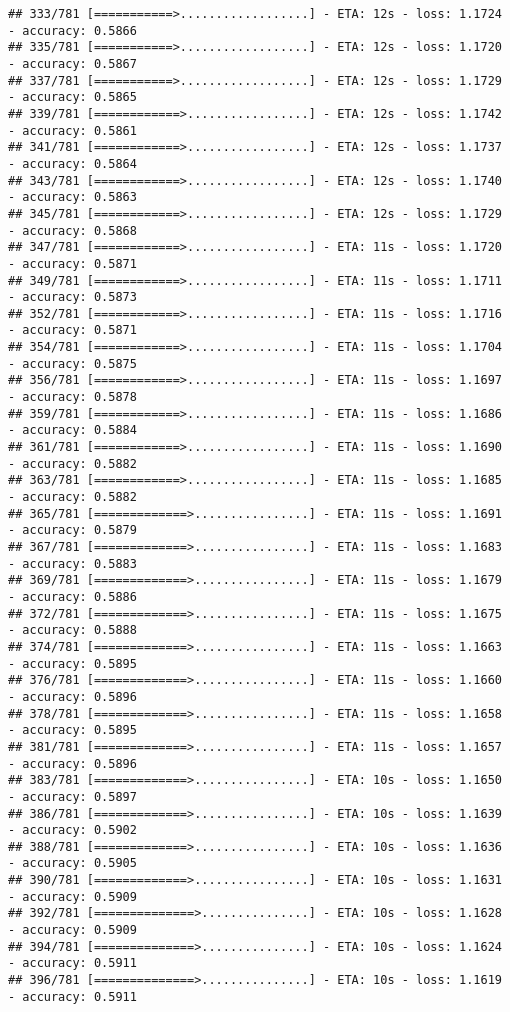 \documentclass[
]{article}
\begin{document}
\begin{verbatim}
## 333/781 [===========>..................] - ETA: 12s - loss: 1.1724 - accuracy: 0.5866
## 335/781 [===========>..................] - ETA: 12s - loss: 1.1720 - accuracy: 0.5867
## 337/781 [===========>..................] - ETA: 12s - loss: 1.1729 - accuracy: 0.5865
## 339/781 [============>.................] - ETA: 12s - loss: 1.1742 - accuracy: 0.5861
## 341/781 [============>.................] - ETA: 12s - loss: 1.1737 - accuracy: 0.5864
## 343/781 [============>.................] - ETA: 12s - loss: 1.1740 - accuracy: 0.5863
## 345/781 [============>.................] - ETA: 12s - loss: 1.1729 - accuracy: 0.5868
## 347/781 [============>.................] - ETA: 11s - loss: 1.1720 - accuracy: 0.5871
## 349/781 [============>.................] - ETA: 11s - loss: 1.1711 - accuracy: 0.5873
## 352/781 [============>.................] - ETA: 11s - loss: 1.1716 - accuracy: 0.5871
## 354/781 [============>.................] - ETA: 11s - loss: 1.1704 - accuracy: 0.5875
## 356/781 [============>.................] - ETA: 11s - loss: 1.1697 - accuracy: 0.5878
## 359/781 [============>.................] - ETA: 11s - loss: 1.1686 - accuracy: 0.5884
## 361/781 [============>.................] - ETA: 11s - loss: 1.1690 - accuracy: 0.5882
## 363/781 [============>.................] - ETA: 11s - loss: 1.1685 - accuracy: 0.5882
## 365/781 [=============>................] - ETA: 11s - loss: 1.1691 - accuracy: 0.5879
## 367/781 [=============>................] - ETA: 11s - loss: 1.1683 - accuracy: 0.5883
## 369/781 [=============>................] - ETA: 11s - loss: 1.1679 - accuracy: 0.5886
## 372/781 [=============>................] - ETA: 11s - loss: 1.1675 - accuracy: 0.5888
## 374/781 [=============>................] - ETA: 11s - loss: 1.1663 - accuracy: 0.5895
## 376/781 [=============>................] - ETA: 11s - loss: 1.1660 - accuracy: 0.5896
## 378/781 [=============>................] - ETA: 11s - loss: 1.1658 - accuracy: 0.5895
## 381/781 [=============>................] - ETA: 11s - loss: 1.1657 - accuracy: 0.5896
## 383/781 [=============>................] - ETA: 10s - loss: 1.1650 - accuracy: 0.5897
## 386/781 [=============>................] - ETA: 10s - loss: 1.1639 - accuracy: 0.5902
## 388/781 [=============>................] - ETA: 10s - loss: 1.1636 - accuracy: 0.5905
## 390/781 [=============>................] - ETA: 10s - loss: 1.1631 - accuracy: 0.5909
## 392/781 [==============>...............] - ETA: 10s - loss: 1.1628 - accuracy: 0.5909
## 394/781 [==============>...............] - ETA: 10s - loss: 1.1624 - accuracy: 0.5911
## 396/781 [==============>...............] - ETA: 10s - loss: 1.1619 - accuracy: 0.5911

\end{verbatim}
\end{document}
